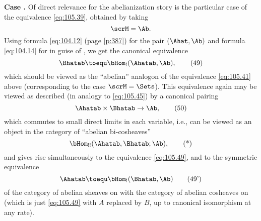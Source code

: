 \textbf{Case .}%
\enspace Of direct relevance for the abelianization story
is the particular case of the equivalence \eqref{eq:105.39}, obtained
by taking
\[\scrM=\Ab.\]
Using formula \eqref{eq:104.12} (page \ref{p:387}) for the pair
$(\Ahat,\Ab)$ and formula \eqref{eq:104.14} for \Bhat{} in guise of
\scrA, we get the canonical equivalence
\begin{equation}
  \label{eq:105.49}
  \Bhatab \toequ \bHom_!(\Ahatab,\Ab),\tag{49}
\end{equation}
which should be viewed as the ``abelian'' analogon of the equivalence
\eqref{eq:105.41} above (corresponding to the case
$\scrM=\Sets$). This equivalence again may be viewed as described (in
analogy to \eqref{eq:105.45}) by a canonical pairing
\begin{equation}
  \label{eq:105.50}
  \Ahatab\times\Bhatab\to\Ab,\tag{50}
\end{equation}
which commutes to small direct limits in each variable, i.e., can be
viewed as an object in the category of ``abelian bi-cosheaves''
\begin{equation}
  \label{eq:105.star}
  \bHom_{!!}(\Ahatab,\Bhatab;\Ab),\tag{*}
\end{equation}
and gives rise simultaneously to the equivalence \eqref{eq:105.49},
and to the symmetric equivalence
\begin{equation}
  \label{eq:105.49prime}
  \Ahatab\toequ\bHom_!(\Bhatab,\Ab)\tag{49'}
\end{equation}
of the category of abelian sheaves on \Ahat{} with the category of
abelian cosheaves on \Bhat{} (which is just \eqref{eq:105.49} with $A$
replaced by $B$, up to canonical isomorphism at any rate).


